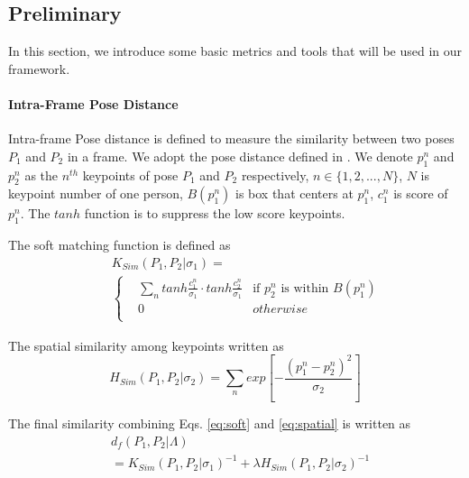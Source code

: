 \documentclass{bmvc2k}
\begin{document}
\subsection{Preliminary}
\vspace{-2mm}
In this section, we introduce some basic metrics and tools that will be used in our framework.
\vspace{-6mm}
\paragraph{Intra-Frame Pose Distance}
Intra-frame Pose distance is defined to measure the similarity between two poses $P_1$ and $P_2$ in a frame. We adopt the pose distance defined in  \cite{fang2017rmpe}. We denote $p_1^n$ and $p_2^n$ as the $n^{th}$ keypoints of pose $P_1$ and $P_2$ respectively, $n \in \{1,2,...,N\}$, $N$ is keypoint number of one person, $B(p_1^n)$ is box that centers at $p_1^n$, $c_1^n$ is score of $p_1^n$. The $tanh$ function is to suppress the low score keypoints. 

The soft matching function is defined as
\begin{equation}
\begin{aligned}
    &K_{Sim}(P_1,P_2| \sigma_1) = \\
    \quad
    &\left\{
    \begin{aligned}
    &\sum_{n} tanh \frac{c_1^n}{\sigma_1} \cdot tanh \frac{c_2^n}{\sigma_1} &\text{if } p_2^n \text{ is within } B(p_1^n) \\
    &0 &otherwise \\
    \end{aligned}
    \right.
    \label{eq:soft}
\end{aligned}
\end{equation}

The spatial similarity among keypoints written as
\begin{equation}
H_{Sim}(P_1,P_2|\sigma_2) = \sum_n exp[-\frac{(p_1^n-p_2^n)^2}{\sigma_2}]
 \label{eq:spatial}
\end{equation}

The final similarity combining Eqs. \ref{eq:soft} and \ref{eq:spatial} is written as
\begin{equation}
\begin{aligned}
&d_f(P_1, P_2|\Lambda) \\
&= K_{Sim}(P_1,P_2|\sigma_1)^{-1} + \lambda H_{Sim}(P_1,P_2|\sigma_2)^{-1}
 \label{eq:dist}
\end{aligned}
\end{equation}
\end{document}
